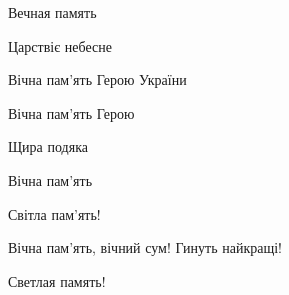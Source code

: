  
 
 
 
 

\qqSecCmt


Вечная память


Царствіє небесне 🙏🏻


Вічна пам'ять Герою України 🙏💙💛


Вічна пам'ять Герою🙏

Щира подяка🙏


Вічна пам'ять


Світла пам'ять!


Вічна пам'ять, вічний сум! Гинуть найкращі!


Светлая память!
